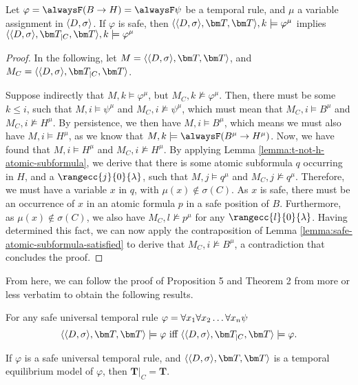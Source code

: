 \begin{lemma}
  Let $\varphi=\alwaysF (B \rightarrow H)=\alwaysF \psi$ be a temporal
  rule, and $\mu$ a variable assignment in $\langle D, \sigma \rangle$. If $\varphi$ is
  safe, then $\qttandt,k \models \varphi^\mu$ implies
  $\qttcandt,k \models \varphi^\mu$
\end{lemma}
\begin{proof}
  In the following, let $M=\qttandt$, and $M_C=\qttcandt$.

  Suppose indirectly that $M,k \models \varphi^\mu$, but
  $M_C,k \not \models \varphi^\mu$. Then, there must be some
  $k\leq i$, such that $M,i \models \psi^\mu$ and
  $M_C,i \not \models \psi^\mu$, which must mean that
  $M_C,i \models B^\mu$ and $M_C,i \not \models H^\mu$. By
  persistence, we then have $M,i \models B^\mu$, which means we must
  also have $M,i \models H^\mu$, as we know that
  $M,k \models \alwaysF(B^\mu \rightarrow H^\mu)$. Now, we have found
  that $M,i \models H^\mu$ and $M_C,i \not \models H^\mu$. By applying
  Lemma \ref{lemma:t-not-h-atomic-subformula}, we derive that there is some atomic subformula
  $q$ occurring in $H$, and a $\rangecc{j}{0}{\lambda}$, such that
  $M,j \models q^\mu$ and $M_C,j \not \models q^\mu$. Therefore, we
  must have a variable $x$ in $q$, with $\mu(x) \not \in
  \sigma(C)$. As $x$ is safe, there must be an occurrence of $x$ in an
  atomic formula $p$ in a safe position of $B$. Furthermore, as
  $\mu(x) \not \in \sigma(C)$, we also have $M_C,l \not \models p^\mu$
  for any $\rangecc{l}{0}{\lambda}$. Having determined this fact, we
  can now apply the contraposition of Lemma \ref{lemma:safe-atomic-subformula-satisfied} to derive
  that $M_C,i \not \models B^\mu$, a contradiction that concludes the
  proof.
\end{proof}

From here, we can follow the proof of Proposition 5 and Theorem 2 from \cite{agcapevidi17a} more
or less verbatim to obtain the following results.

\begin{proposition}
  For any safe universal temporal rule $\varphi = \forall x_1 \forall x_2 \dots \forall x_n \psi$
  \begin{equation*} \qttandt \models \varphi \text{ iff } \qttcandt \models \varphi. \end{equation*}
\end{proposition}

\begin{theorem}
  If $\varphi$ is a safe universal temporal rule, and $\qttandt$ is a temporal equilibrium
  model of $\varphi$, then $\bm{T}\vert_{C}=\bm{T}$.
\end{theorem}

